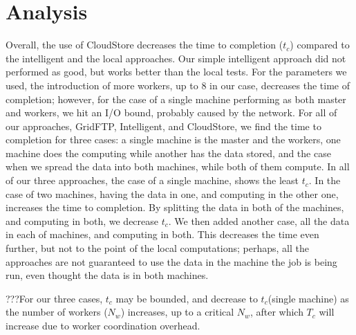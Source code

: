 \documentclass[a4paper,12pt]{article}
\begin{document}
\section{Analysis}

Overall, the use of CloudStore decreases the time to completion ($t_c$) compared to the intelligent and the local approaches. Our simple intelligent approach did not performed as good, but works better than the local tests. For the parameters we used, the introduction of more workers, up to 8 in our case, decreases the time of completion; however, for the case of a single machine performing as both master and workers, we hit an I/O bound, probably caused by the network. For all of our approaches, GridFTP, Intelligent, and CloudStore, we find the time to completion for three cases: a single machine is the master and the workers, one machine does the computing while another has the data stored, and the case when we spread the data into both machines, while both of them compute.  In all of our three approaches, the case of a single machine, shows the least $t_c$. In the case of two machines, having the data in one, and computing in the other one, increases the time to completion. By splitting the data in both of the machines, and computing in both, we decrease $t_c$. We then added another case, all the data in each of machines, and computing in both. This decreases the time even further, but not to the point of the local computations; perhaps, all the approaches are not guaranteed to use the data in the machine the job is being run, even thought the data is in both machines.

???For our three cases,  $t_c$ may be bounded, and decrease to $t_c$(single machine) as  the number of workers ($N_w$) increases, up to a critical $N_w$, after which $T_c$ will increase due to worker coordination overhead.
\end{document}
